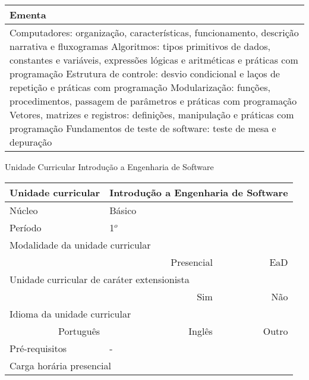 \begin{quadro}[h!]
\begin{tabular}{|p{3cm} p{2cm} p{3cm} p{2cm} p{3cm} p{2cm}|}
\multicolumn{6}{|p{15cm}|}{\cellcolor{blue1} Ementa} \\\hline
\hline\multicolumn{6}{|p{15cm}|}{\scriptsize Computadores: organização, características, funcionamento, descrição narrativa e fluxogramas Algoritmos: tipos primitivos de dados, constantes e variáveis, expressões lógicas e aritméticas e práticas com programação Estrutura de controle: desvio condicional e laços de repetição e práticas com programação Modularização: funções, procedimentos, passagem de parâmetros e práticas com programação Vetores, matrizes e registros: definições, manipulação e práticas com programação Fundamentos de teste de software: teste de mesa e depuração}\\\hline
\hline
	\end{tabular}
\end{quadro}
\begin{quadro}[h!]
  \centering\scriptsize
\caption{Unidade Curricular Introdução a Engenharia de Software}
\label{ unit_1 }
\begin{tabular}{|p{3cm} p{2cm} p{3cm} p{2cm} p{3cm} p{2cm}|}\hline
\multicolumn{1}{|p{3cm}|}{\cellcolor{blue1} Unidade curricular} & \multicolumn{5}{p{9cm}|}{ Introdução a Engenharia de Software }\\\hline
\multicolumn{1}{|p{3cm}|}{\cellcolor{blue1} Núcleo} & \multicolumn{5}{p{11.5cm}|}{ Básico }\\\hline
\multicolumn{1}{|p{3cm}|}{\cellcolor{blue1} Período} & \multicolumn{5}{p{9cm}|}{ 1$^o$ }\\\hline
\multicolumn{6}{|p{15cm}|}{\cellcolor{blue1} Modalidade da unidade curricular} \\\hline
\multicolumn{2}{|r}{		} &  \multicolumn{2}{r}{Presencial \XBox } & \multicolumn{2}{r|}{EaD \Square	} \\\hline
\multicolumn{6}{|p{15cm}|}{\cellcolor{blue1} Unidade curricular de caráter extensionista} \\\hline
\multicolumn{4}{|r}{			Sim \Square	} & \multicolumn{2}{r|}{	Não \XBox	}\\\hline
\multicolumn{6}{|p{15cm}|}{\cellcolor{blue1} Idioma da unidade curricular} \\ \hline
\multicolumn{2}{|r}{	Português \XBox	} &  \multicolumn{2}{r}{	Inglês \Square	} & \multicolumn{2}{r|}{	Outro \Square	} \\ \hline
\multicolumn{1}{|p{3cm}|}{\cellcolor{blue1} Pré-requisitos} & \multicolumn{5}{p{9cm}|}{ - }\\ \hline
\multicolumn{6}{|p{15cm}|}{\cellcolor{blue1} Carga horária presencial} \\ \hline

\end{tabular}
\end{quadro}
